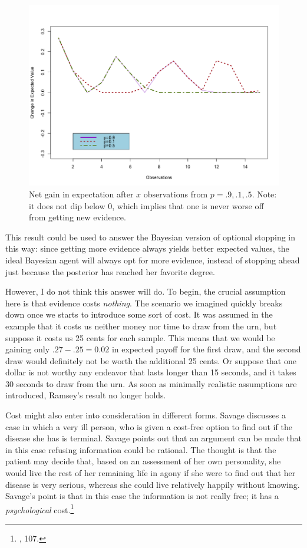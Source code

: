 \begin{figure}[h] 
\begin{center}
\includegraphics[scale=0.5]{Expectedchange.png}
	\caption{Net gain in expectation after $x$ observations from $p=.9,.1,.5$. Note: it does not dip below 0, which implies that one is never worse off from getting new evidence.}
	\label{fig:expectedchange}
\end{center}	
\end{figure}


This result could be used to answer the Bayesian version of optional
stopping in this way: since getting more evidence always yields better
expected values, the ideal Bayesian agent will always opt for more
evidence, instead of stopping ahead just because the posterior has
reached her favorite degree.

However, I do not think this answer will do. To begin, the crucial
assumption here is that evidence costs \emph{nothing}. The scenario we
imagined quickly breaks down once we starts to introduce some sort of
cost. It was assumed in the example that it costs us neither money nor
time to draw from the urn, but suppose it costs us 25 cents for each
sample. This means that we would be gaining only \(.27-.25 = 0.02\) in
expected payoff for the first draw, and the second draw would definitely
not be worth the additional 25 cents. Or suppose that one dollar is not
worthy any endeavor that lasts longer than 15 seconds, and it takes 30
seconds to draw from the urn. As soon as minimally realistic assumptions
are introduced, Ramsey's result no longer holds.

Cost might also enter into consideration in different forms. Savage
discusses a case in which a very ill person, who is given a cost-free option
to find out if the disease she has is terminal. Savage points out that an argument can be made that in this case refusing information could be rational. The thought is that the patient
may decide that, based on an assessment of her own personality, she
would live the rest of her remaining life in agony if she were to find
out that her disease is very serious, whereas she could live relatively
happily without knowing. Savage's point is that in this case the
information is not really free; it has a \emph{psychological}
cost.\footnote{\cite{savage}, 107.} 


